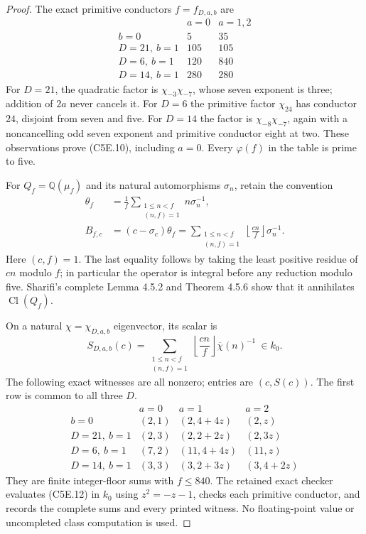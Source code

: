 \begin{proof}
The exact primitive conductors $f=f_{D,a,b}$ are
\[
 \begin{array}{c|cc}
       &a=0&a=1,2\\\hline
 b=0&5&35\\
 D=21,\ b=1&105&105\\
 D=6,\ b=1&120&840\\
 D=14,\ b=1&280&280
 \end{array}
 \tag{C5E.10}
\]
For $D=21$, the quadratic factor is $\chi_{-3}\chi_{-7}$,
whose seven exponent is three; addition of $2a$ never cancels it.
For $D=6$ the primitive factor $\chi_{24}$ has conductor $24$,
disjoint from seven and five.  For $D=14$ the factor is
$\chi_{-8}\chi_{-7}$, again with a noncancelling odd seven
exponent and primitive conductor eight at two.
These observations prove (C5E.10), including $a=0$.
Every $\varphi(f)$ in the table is prime to five.

For $Q_f=\mathbb Q(\mu_f)$ and its natural automorphisms
$\sigma_n$, retain the convention
\[
 \begin{aligned}
 \theta_f&=\frac1f\sum_{\substack{1\leq n<f\\(n,f)=1}}
                  n\sigma_n^{-1},\\
 B_{f,c}&=(c-\sigma_c)\theta_f
     =\sum_{\substack{1\leq n<f\\(n,f)=1}}
                  \left\lfloor\frac{cn}{f}\right\rfloor\sigma_n^{-1}.
 \end{aligned}
 \tag{C5E.11}
\]
Here $(c,f)=1$.  The last equality follows by taking the
least positive residue of $cn$ modulo $f$; in particular
the operator is integral before any reduction modulo five.
Sharifi's complete Lemma 4.5.2 and Theorem 4.5.6 show that
it annihilates $\operatorname{Cl}(Q_f)$.

On a natural $\chi=\chi_{D,a,b}$ eigenvector, its scalar is
\[
       S_{D,a,b}(c)=
       \sum_{\substack{1\leq n<f\\(n,f)=1}}
           \left\lfloor\frac{cn}{f}\right\rfloor
                              \overline\chi(n)^{-1}\ \in k_0.
 \tag{C5E.12}
\]
The following exact witnesses are all nonzero; entries are
$(c,S(c))$.  The first row is common to all three $D$.
\[
 \begin{array}{c|ccc}
      &a=0&a=1&a=2\\\hline
 b=0&(2,1)&(2,4+4z)&(2,z)\\
 D=21,\ b=1&(2,3)&(2,2+2z)&(2,3z)\\
 D=6,\ b=1&(7,2)&(11,4+4z)&(11,z)\\
 D=14,\ b=1&(3,3)&(3,2+3z)&(3,4+2z)
 \end{array}
 \tag{C5E.13}
\]
They are finite integer-floor sums with $f\leq840$.
The retained exact checker evaluates (C5E.12) in
$k_0$ using $z^2=-z-1$, checks each primitive conductor,
and records the complete sums and every printed witness.
No floating-point value or uncompleted class computation is used.


\end{proof}
